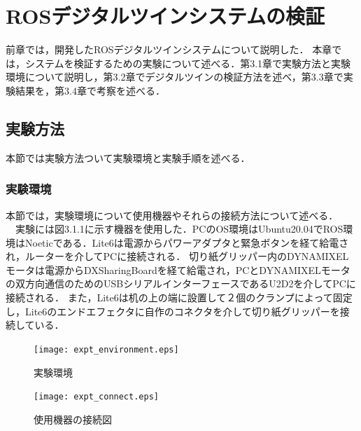 \chapter{%
ROSデジタルツインシステムの検証}

前章では，開発したROSデジタルツインシステムについて説明した．
本章では，システムを検証するための実験について述べる．第3.1章で実験方法と実験環境について説明し，第3.2章でデジタルツインの検証方法を述べ，第3.3章で実験結果を，第3.4章で考察を述べる．

\section{実験方法}
本節では実験方法ついて実験環境と実験手順を述べる．
\subsection{実験環境}
本節では，実験環境について使用機器やそれらの接続方法について述べる．\\
　実験には図3.1.1に示す機器を使用した．PCのOS環境はUbuntu20.04でROS環境はNoeticである．Lite6は電源からパワーアダプタと緊急ボタンを経て給電され，ルーターを介してPCに接続される．
切り紙グリッパー内のDYNAMIXELモータは電源からDXSharingBoardを経て給電され，PCとDYNAMIXELモータの双方向通信のためのUSBシリアルインターフェースであるU2D2を介してPCに接続される．
また，Lite6は机の上の端に設置して２個のクランプによって固定し，Lite6のエンドエフェクタに自作のコネクタを介して切り紙グリッパーを接続している．

\begin{figure}[htbt]
    \centering
     \texttt{[image: expt\_environment.eps]}
     \caption{実験環境}
     \label{fig:f2}
\end{figure}

\begin{figure}[htbt]
    \centering
     \texttt{[image: expt\_connect.eps]}
     \caption{使用機器の接続図}
     \label{fig:f2}
\end{figure}

